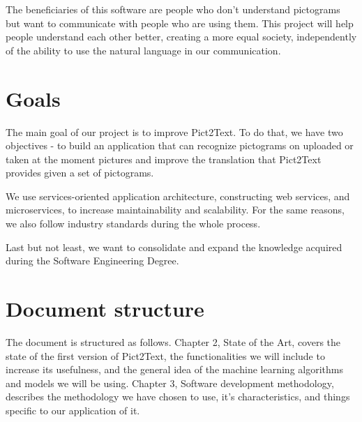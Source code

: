 The beneficiaries of this software are people who don't understand pictograms but want to communicate with people who are using them. This project will help people understand each other better, creating a more equal society, independently of the ability to use the natural language in our communication. 

\section{Goals}
The main goal of our project is to improve Pict2Text. To do that, we have two objectives - to build an application that can recognize pictograms on uploaded or taken at the moment pictures and improve the translation that Pict2Text provides given a set of pictograms.

We use services-oriented application architecture, constructing web services, and microservices, to increase maintainability and scalability. For the same reasons, we also follow industry standards during the whole process.

Last but not least, we want to consolidate and expand the knowledge acquired during the Software Engineering Degree.

\section{Document structure}
The document is structured as follows.
Chapter 2, State of the Art, covers the state of the first version of Pict2Text, the functionalities we will include to increase its usefulness, and the general idea of the machine learning algorithms and models we will be using.
Chapter 3, Software development methodology, describes the methodology we have chosen to use, it's characteristics, and things specific to our application of it. 







